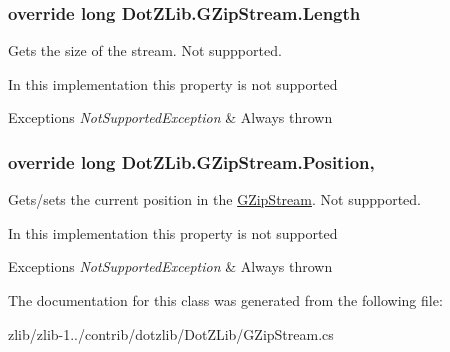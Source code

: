 \hypertarget{class_dot_z_lib_1_1_g_zip_stream_a1f9085926146b0695ea80b8fe78d3a1b}{
\subsubsection[{Length}]{\setlength{\rightskip}{0pt plus 5cm}override long Dot\+Z\+Lib.\+G\+Zip\+Stream.\+Length\hspace{0.3cm}{\ttfamily [get]}}}\label{class_dot_z_lib_1_1_g_zip_stream_a1f9085926146b0695ea80b8fe78d3a1b}


Gets the size of the stream. Not suppported. 

In this implementation this property is not supported


\begin{DoxyExceptions}{Exceptions}
{\em Not\+Supported\+Exception} & Always thrown\\
\hline
\end{DoxyExceptions}
\hypertarget{class_dot_z_lib_1_1_g_zip_stream_a428305f6744e85cc0ad96c0395bad9cf}{
\subsubsection[{Position}]{\setlength{\rightskip}{0pt plus 5cm}override long Dot\+Z\+Lib.\+G\+Zip\+Stream.\+Position\hspace{0.3cm}{\ttfamily [get]}, {\ttfamily [set]}}}\label{class_dot_z_lib_1_1_g_zip_stream_a428305f6744e85cc0ad96c0395bad9cf}


Gets/sets the current position in the {\ttfamily \hyperlink{class_dot_z_lib_1_1_g_zip_stream}{G\+Zip\+Stream}}. Not suppported. 

In this implementation this property is not supported


\begin{DoxyExceptions}{Exceptions}
{\em Not\+Supported\+Exception} & Always thrown\\
\hline
\end{DoxyExceptions}


The documentation for this class was generated from the following file\+:\begin{DoxyCompactItemize}
\item 
zlib/zlib-\/1../contrib/dotzlib/\+Dot\+Z\+Lib/G\+Zip\+Stream.\+cs\end{DoxyCompactItemize}
